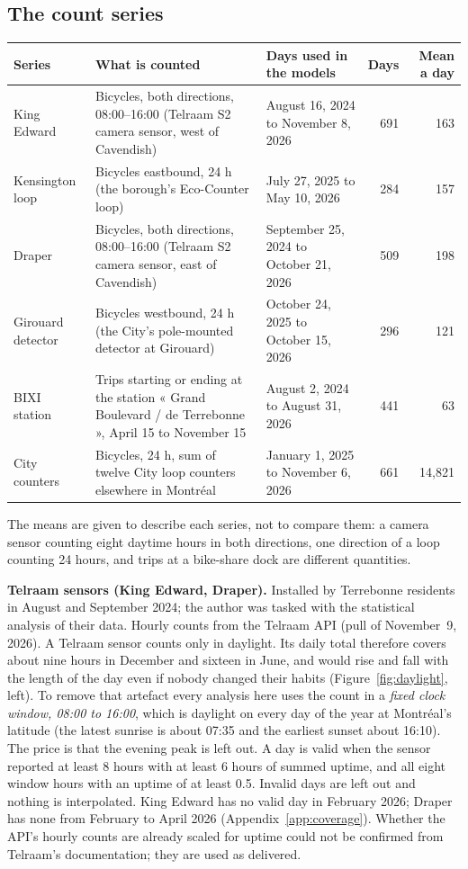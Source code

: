 \documentclass[11pt,a4paper]{article}
\begin{document}
\subsection{The count series}
\begin{center}\small\begin{tabular}{@{}p{2.4cm}p{6.1cm}p{4.0cm}rr@{}}\toprule
Series & What is counted & Days used in the models & Days & Mean a day\\\midrule
King Edward & Bicycles, both directions, 08:00--16:00 (Telraam S2 camera sensor, west of Cavendish) & August 16, 2024 to November 8, 2026 & 691 & 163 \\
Kensington loop & Bicycles eastbound, 24 h (the borough\textquoteright{}s Eco-Counter loop) & July 27, 2025 to May 10, 2026 & 284 & 157 \\
Draper & Bicycles, both directions, 08:00--16:00 (Telraam S2 camera sensor, east of Cavendish) & September 25, 2024 to October 21, 2026 & 509 & 198 \\
Girouard detector & Bicycles westbound, 24 h (the City\textquoteright{}s pole-mounted detector at Girouard) & October 24, 2025 to October 15, 2026 & 296 & 121 \\
BIXI station & Trips starting or ending at the station « Grand Boulevard / de Terrebonne », April 15 to November 15 & August 2, 2024 to August 31, 2026 & 441 & 63 \\
City counters & Bicycles, 24 h, sum of twelve City loop counters elsewhere in Montréal & January 1, 2025 to November 6, 2026 & 661 & 14,821 \\
\bottomrule\end{tabular}\end{center}
The means are given to describe each series, not to compare them: a camera sensor counting eight daytime hours in both directions, one direction of a loop counting 24 hours, and trips at a bike-share dock are different quantities.

\textbf{Telraam sensors (King Edward, Draper).} Installed by Terrebonne residents in August and September 2024; the author was tasked with the statistical analysis of their data. Hourly counts from the Telraam API (pull of November~9, 2026). A Telraam sensor counts only in daylight. Its daily total therefore covers about nine hours in December and sixteen in June, and would rise and fall with the length of the day even if nobody changed their habits (Figure~\ref{fig:daylight}, left). To remove that artefact every analysis here uses the count in a \emph{fixed clock window, 08:00 to 16:00}, which is daylight on every day of the year at Montréal\textquoteright{}s latitude (the latest sunrise is about 07:35 and the earliest sunset about 16:10). The price is that the evening peak is left out. A day is valid when the sensor reported at least 8 hours with at least 6 hours of summed uptime, and all eight window hours with an uptime of at least 0.5. Invalid days are left out and nothing is interpolated. King Edward has no valid day in February 2026; Draper has none from February to April 2026 (Appendix~\ref{app:coverage}). Whether the API\textquoteright{}s hourly counts are already scaled for uptime could not be confirmed from Telraam\textquoteright{}s documentation; they are used as delivered.
\end{document}
